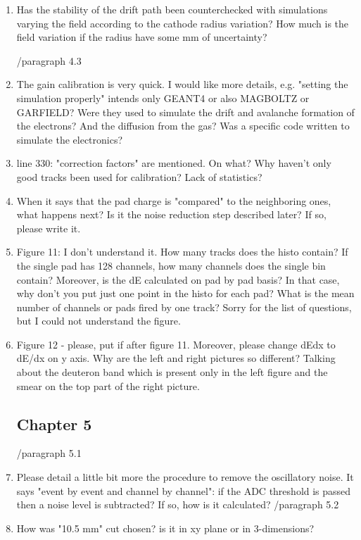\documentclass[a4paper,11pt,twoside]{article}
\begin{document}
\begin{enumerate}
\item Has the stability of the drift path been counterchecked with simulations varying the field according to the cathode radius variation? How much is the field variation if the radius have some mm of uncertainty?
\textcolor{blue}{ } 

        /paragraph 4.3
\item The gain calibration is very quick. I would like more details, e.g. "setting the simulation properly" intends only GEANT4 or also MAGBOLTZ or GARFIELD? Were they used to simulate the drift and avalanche formation of the electrons? And the diffusion from the gas? Was a specific code written to simulate the electronics?
\textcolor{blue}{ } 

\item line 330: "correction factors" are mentioned. On what? Why haven't only good tracks been used for calibration? Lack of statistics?
\textcolor{blue}{ } 

\item When it says that the pad charge is "compared" to the neighboring ones, what happens next? Is it the noise reduction step described later? If so, please write it. 
\textcolor{blue}{ } 

\item Figure 11: I don't understand it. How many tracks does the histo contain? If the single pad has 128 channels, how many channels does the single bin contain? Moreover, is the dE calculated on pad by pad basis? In that case, why don't you put just one point in the histo for each pad? What is the mean number of channels or pads fired by one track? Sorry for the list of questions, but I could not understand the figure.
\textcolor{blue}{ } 

\item Figure 12 - please, put if after figure 11. Moreover, please change dEdx to dE/dx on y axis. Why are the left and right pictures so different? Talking about the deuteron band which is present only in the left figure and the smear on the top part of the right picture. 
\textcolor{blue}{ } 

\subsection*{ Chapter 5}
	/paragraph 5.1	
\item Please detail a little bit more the procedure to remove the oscillatory noise. It says "event by event and channel by channel": if the ADC threshold is passed then a noise level is subtracted? If so, how is it calculated?
\textcolor{blue}{ } 
        /paragraph 5.2
\item How was "10.5 mm" cut chosen? is it in xy plane or in 3-dimensions?
\textcolor{blue}{ } 


\end{enumerate}
\end{document}
